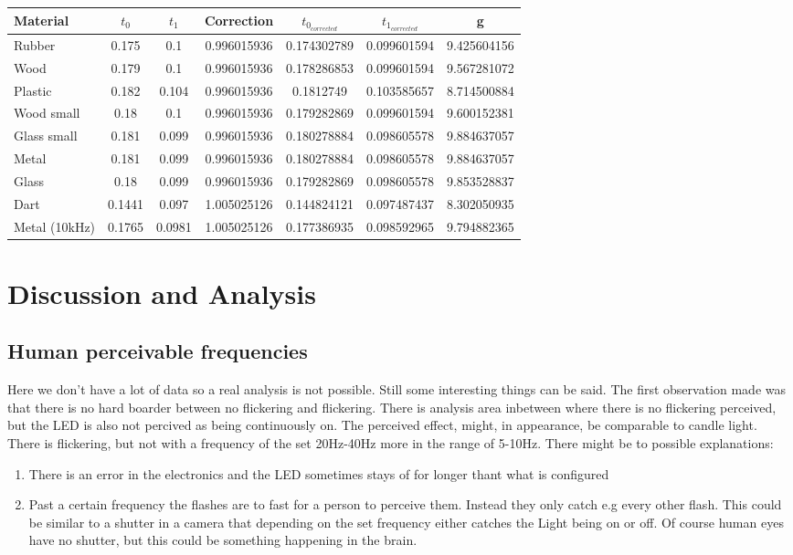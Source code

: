 \documentclass[fleqn,14pt]{article}
\begin{document}
\begin{tabular}{lcccccc}
  Material & $t_0$ & $t_1$ & Correction & $t_{0_{corrected}}$ & $t_{1_{corrected}}$ & g\\
  \midrule
  Rubber & 0.175 & 0.1 & 0.996015936 & 0.174302789 & 0.099601594 & 9.425604156\\
  Wood & 0.179 & 0.1 & 0.996015936 & 0.178286853 & 0.099601594 & 9.567281072\\
  Plastic & 0.182 & 0.104 & 0.996015936 & 0.1812749 & 0.103585657 & 8.714500884\\
  Wood small & 0.18 & 0.1 & 0.996015936 & 0.179282869 & 0.099601594 & 9.600152381\\
  Glass small & 0.181 & 0.099 & 0.996015936 & 0.180278884 & 0.098605578 & 9.884637057\\
  Metal & 0.181 & 0.099 & 0.996015936 & 0.180278884 & 0.098605578 & 9.884637057\\
  Glass  & 0.18 & 0.099 & 0.996015936 & 0.179282869 & 0.098605578 & 9.853528837\\
  Dart & 0.1441 & 0.097 & 1.005025126 & 0.144824121 & 0.097487437 & 8.302050935\\
  Metal (10kHz)& 0.1765 & 0.0981 & 1.005025126 & 0.177386935 & 0.098592965 & 9.794882365\\

\end{tabular}
\vspace{0.5cm}


\section{Discussion and Analysis}

\subsection{Human perceivable frequencies}
Here we don't have a lot of data so a real analysis is not possible. Still some interesting things can be said.
The first observation made was that there is no hard boarder between no flickering and flickering. There is analysis
area inbetween where there is no flickering perceived, but the LED is also not percived as being continuously on.
The perceived effect, might, in appearance, be comparable to candle light. There is flickering, but not with
a frequency of the set 20Hz-40Hz more in the range of 5-10Hz. There might be to possible explanations:

\begin{enumerate}
  \item There is an error in the electronics and the LED sometimes stays of for longer thant what is configured
  \item Past a certain frequency the flashes are to fast for a person to perceive them. Instead they only
  catch e.g every other flash. This could be similar to a shutter in a camera that depending on the set frequency
  either catches the Light being on or off. Of course human eyes have no shutter, but this could be something
  happening in the brain.
\end{enumerate}
\end{document}
